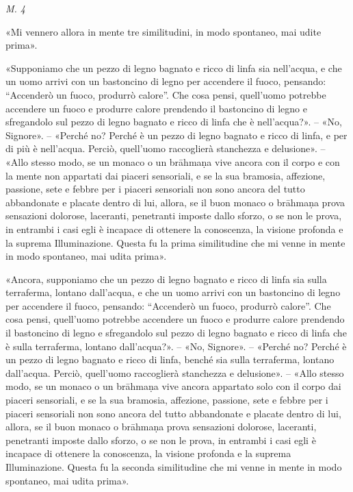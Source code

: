 \emph{M. 4}


«Mi vennero allora in mente tre similitudini, in modo spontaneo, mai
udite prima».


«Supponiamo che un pezzo di legno bagnato e ricco di linfa sia
nell’acqua, e che un uomo arrivi con un bastoncino di legno per
accendere il fuoco, pensando: “Accenderò un fuoco, produrrò calore”. Che
cosa pensi, quell’uomo potrebbe accendere un fuoco e produrre calore
prendendo il bastoncino di legno e sfregandolo sul pezzo di legno
bagnato e ricco di linfa che è nell’acqua?». – «No, Signore». – «Perché
no? Perché è un pezzo di legno bagnato e ricco di linfa, e per di più è
nell’acqua. Perciò, quell’uomo raccoglierà stanchezza e delusione». –
«Allo stesso modo, se un monaco o un brāhmaṇa vive ancora con il corpo e
con la mente non appartati dai piaceri sensoriali, e se la sua bramosia,
affezione, passione, sete e febbre per i piaceri sensoriali non sono
ancora del tutto abbandonate e placate dentro di lui, allora, se il buon
monaco o brāhmaṇa prova sensazioni dolorose, laceranti, penetranti
imposte dallo sforzo, o se non le prova, in entrambi i casi egli è
incapace di ottenere la conoscenza, la visione profonda e la suprema
Illuminazione. Questa fu la prima similitudine che mi venne in mente in
modo spontaneo, mai udita prima».


«Ancora, supponiamo che un pezzo di legno bagnato e ricco di linfa sia
sulla terraferma, lontano dall’acqua, e che un uomo arrivi con un
bastoncino di legno per accendere il fuoco, pensando: “Accenderò un
fuoco, produrrò calore”. Che cosa pensi, quell’uomo potrebbe accendere
un fuoco e produrre calore prendendo il bastoncino di legno e
sfregandolo sul pezzo di legno bagnato e ricco di linfa che è sulla
terraferma, lontano dall’acqua?». – «No, Signore». – «Perché no? Perché è
un pezzo di legno bagnato e ricco di linfa, benché sia sulla terraferma,
lontano dall’acqua. Perciò, quell’uomo raccoglierà stanchezza e
delusione». – «Allo stesso modo, se un monaco o un brāhmaṇa vive ancora
appartato solo con il corpo dai piaceri sensoriali, e se la sua
bramosia, affezione, passione, sete e febbre per i piaceri sensoriali
non sono ancora del tutto abbandonate e placate dentro di lui, allora,
se il buon monaco o brāhmaṇa prova sensazioni dolorose, laceranti,
penetranti imposte dallo sforzo, o se non le prova, in entrambi i casi
egli è incapace di ottenere la conoscenza, la visione profonda e la
suprema Illuminazione. Questa fu la seconda similitudine che mi venne in
mente in modo spontaneo, mai udita prima».


